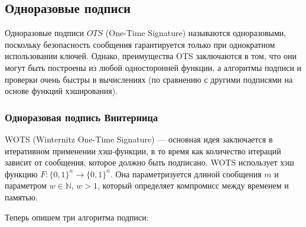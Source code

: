 \documentclass[a4paper, 14pt]{extarticle}
\begin{document}
\subsection{Одноразовые подписи}
\label{ots}
Одноразовые подписи $OTS$ (One-Time Signature) называются одноразовыми, поскольку безопасность сообщения гарантируется только при однократном использовании ключей. Однако, преимущества OTS заключаются в том, что они могут быть построены из любой односторонней функции, а алгоритмы подписи и проверки очень быстры в вычислениях (по сравнению с другими подписями на основе функций хэширования).
\subsubsection{Одноразовая подпись Винтерница}
WOTS (Winternitz One-Time Signature) \cite{wots} --- основная идея заключается в итеративном применении хэш-функции, в то время как количество итераций зависит от сообщения, которое должно быть подписано. WOTS использует хэш функцию $F : \{0, 1\}^{n} \rightarrow \{0, 1\}^{n}$. Она параметризуется длиной сообщения $m$ и параметром $w \in \mathbb{N}$, $w > 1$, который определяет компромисс между временем и памятью.

Теперь опишем три алгоритма подписи:
\end{document}
